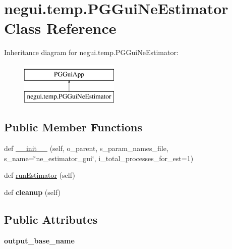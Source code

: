 \hypertarget{classnegui_1_1temp_1_1PGGuiNeEstimator}{}\section{negui.\+temp.\+P\+G\+Gui\+Ne\+Estimator Class Reference}
\label{classnegui_1_1temp_1_1PGGuiNeEstimator}
Inheritance diagram for negui.\+temp.\+P\+G\+Gui\+Ne\+Estimator\+:\begin{figure}[H]
\begin{center}
\leavevmode
\includegraphics[height=2.000000cm]{classnegui_1_1temp_1_1PGGuiNeEstimator}
\end{center}
\end{figure}
\subsection*{Public Member Functions}
\begin{DoxyCompactItemize}
\item 
def \hyperlink{classnegui_1_1temp_1_1PGGuiNeEstimator_a344d7795f41cf7846744007e579ab532}{\+\_\+\+\_\+init\+\_\+\+\_\+} (self, o\+\_\+parent, s\+\_\+param\+\_\+names\+\_\+file, s\+\_\+name=\char`\"{}ne\+\_\+estimator\+\_\+gui\char`\"{}, i\+\_\+total\+\_\+processes\+\_\+for\+\_\+est=1)
\item 
def \hyperlink{classnegui_1_1temp_1_1PGGuiNeEstimator_aeca10842846f571142c767a394734f48}{run\+Estimator} (self)
\item 
def {\bfseries cleanup} (self)\hypertarget{classnegui_1_1temp_1_1PGGuiNeEstimator_af2af7df1279e249a1633c3bd158784d1}{}\label{classnegui_1_1temp_1_1PGGuiNeEstimator_af2af7df1279e249a1633c3bd158784d1}

\end{DoxyCompactItemize}
\subsection*{Public Attributes}
\begin{DoxyCompactItemize}
\item 
{\bfseries output\+\_\+base\+\_\+name}\hypertarget{classnegui_1_1temp_1_1PGGuiNeEstimator_ae81206ca875278e3350b118310eb85f2}{}\label{classnegui_1_1temp_1_1PGGuiNeEstimator_ae81206ca875278e3350b118310eb85f2}

\end{DoxyCompactItemize}
